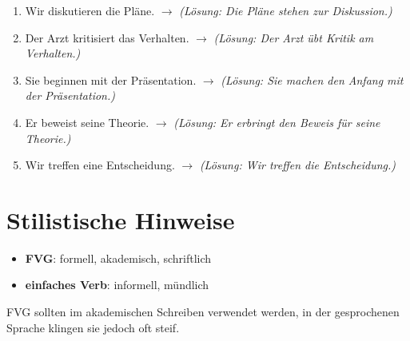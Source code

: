 \begin{enumerate}
    \item Wir diskutieren die Pläne. $\rightarrow$ \textit{(Lösung: Die Pläne stehen zur Diskussion.)}
    \item Der Arzt kritisiert das Verhalten. $\rightarrow$ \textit{(Lösung: Der Arzt übt Kritik am Verhalten.)}
    \item Sie beginnen mit der Präsentation. $\rightarrow$ \textit{(Lösung: Sie machen den Anfang mit der Präsentation.)}
    \item Er beweist seine Theorie. $\rightarrow$ \textit{(Lösung: Er erbringt den Beweis für seine Theorie.)}
    \item Wir treffen eine Entscheidung. $\rightarrow$ \textit{(Lösung: Wir treffen die Entscheidung.)}
\end{enumerate}

\section{Stilistische Hinweise}
\label{sec:FVGStil}

\begin{tcolorbox}[title=Stil]
\begin{itemize}
    \item \textbf{FVG}: formell, akademisch, schriftlich
    \item \textbf{einfaches Verb}: informell, mündlich
\end{itemize}
\end{tcolorbox}

FVG sollten im akademischen Schreiben verwendet werden, in der gesprochenen Sprache klingen sie jedoch oft steif.

\chapterend